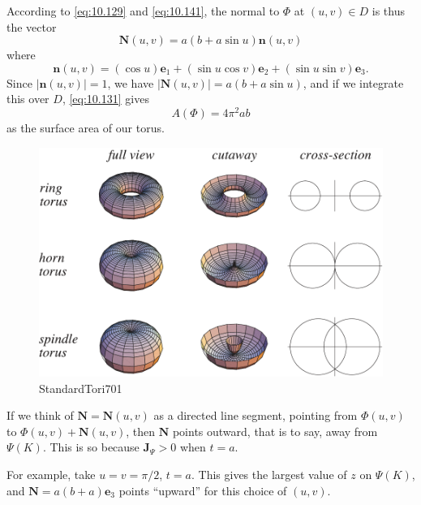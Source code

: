 \begin{newexample}
    According to \eqref{eq:10.129} and \eqref{eq:10.141}, 
    the normal to $\Phi$ at $(u, v) \in D$ is thus the vector
    \begin{equation*}
        \mathbf{N}(u,v) = a(b+a\sin u) \mathbf{n}(u,v)
    \end{equation*}
    where 
    \begin{equation*}
        \mathbf{n}(u,v) = 
        (\cos u) \mathbf{e}_1 + 
        (\sin u \cos v) \mathbf{e}_2 + 
        (\sin u \sin v) \mathbf{e}_3 . 
    \end{equation*}
    Since $|\mathbf{n}(u, v)| = 1$, 
    we have $|\mathbf{N}(u, v)| = a(b + a \sin u)$, 
    and if we integrate this over $D$, \eqref{eq:10.131} gives
    \begin{equation*}
        A(\Phi) = 4\pi^2 ab
    \end{equation*}
    as the surface area of our torus.
    \begin{figure}[htbp]
        \centering
        \includegraphics[width=0.7\linewidth]{pic/StandardTori701.pdf}
        \caption{StandardTori701}
        \label{fig:StandardTori701}
    \end{figure}
    If we think of $\mathbf{N} = \mathbf{N}(u, v)$ as a directed line segment, 
    pointing from $\Phi(u, v)$ to $\Phi(u, v) + \mathbf{N}(u, v)$, 
    then $\mathbf{N}$ points outward, 
    that is to say, away from $\Psi(K)$. 
    This is so because $\mathbf{J}_{\Psi} > 0$ when $t = a$.

    For example, take $u = v = \pi/2$, $t = a$. 
    This gives the largest value of $z$ on $\Psi(K)$, 
    and $\mathbf{N} = a(b + a)\mathbf{e}_3$ points ``upward'' for this choice of $(u, v)$.
\end{newexample}

\begin{mydef}
    \label{mydef:10.48}
    
\end{mydef}

